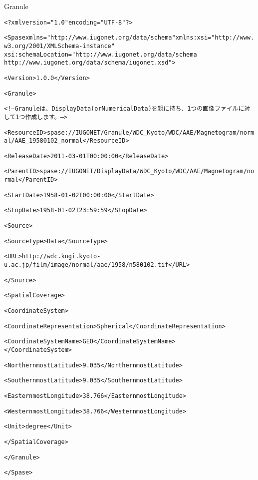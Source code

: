 \begin{itembox}[1]{Granule}
{\scriptsize
\begin{alltt}
<?xml version="1.0" encoding="UTF-8"?>
  
<Spase xmlns="http://www.iugonet.org/data/schema" xmlns:xsi="http://www.w3.org/2001/XMLSchema-instance" 
              xsi:schemaLocation="http://www.iugonet.org/data/schema 
              http://www.iugonet.org/data/schema/iugonet.xsd ">
  
  <Version>1.0.0</Version>
  
  {\color{blue}<Granule>

  <!-- Granuleは、DisplayData(or NumericalData)を親に持ち、1つの画像ファイルに対して1つ作成します。 -->}
    <ResourceID>spase://IUGONET/Granule/WDC_Kyoto/WDC/AAE/Magnetogram/normal/AAE_19580102_normal</ResourceID>
    
    <ReleaseDate>2011-03-01T00:00:00</ReleaseDate>
    
    <ParentID>spase://IUGONET/DisplayData/WDC_Kyoto/WDC/AAE/Magnetogram/normal</ParentID>
    
    <StartDate>1958-01-02T00:00:00</StartDate>
    
    <StopDate>1958-01-02T23:59:59</StopDate>
    
    <Source>
      
      <SourceType>Data</SourceType>
      
      <URL>http://wdc.kugi.kyoto-u.ac.jp/film/image/normal/aae/1958/n580102.tif</URL>
    
    </Source>
    
    <SpatialCoverage>
      
      <CoordinateSystem>
      
        <CoordinateRepresentation>Spherical</CoordinateRepresentation>
      
        <CoordinateSystemName>GEO</CoordinateSystemName>
      </CoordinateSystem>
      
      <NorthernmostLatitude>9.035</NorthernmostLatitude>
      
      <SouthernmostLatitude>9.035</SouthernmostLatitude>
      
      <EasternmostLongitude>38.766</EasternmostLongitude>
      
      <WesternmostLongitude>38.766</WesternmostLongitude>
      
      <Unit>degree</Unit>
    
    </SpatialCoverage>
  
  </Granule>

</Spase>

\end{alltt}
}
\end{itembox}

